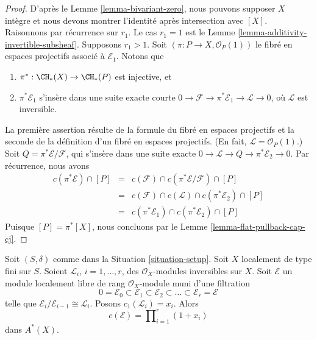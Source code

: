 \begin{proof}
D'après le Lemme \ref{lemma-bivariant-zero}, nous pouvons supposer $X$ intègre
et nous devons montrer l'identité après intersection avec $[X]$.
Raisonnons par récurrence sur $r_1$. Le cas $r_1 = 1$ est le
Lemme \ref{lemma-additivity-invertible-subsheaf}.
Supposons $r_1 > 1$. Soit $(\pi : P \to X, \mathcal{O}_P(1))$
le fibré en espaces projectifs associé à $\mathcal{E}_1$. Notons que
\begin{enumerate}
\item $\pi^* : \CH_*(X) \to \CH_*(P)$ est injective, et
\item $\pi^*\mathcal{E}_1$ s'insère dans une suite exacte courte
$0 \to \mathcal{F} \to \pi^*\mathcal{E}_1 \to \mathcal{L} \to 0$,
où $\mathcal{L}$ est inversible.
\end{enumerate}
La première assertion résulte de la formule du fibré en espaces projectifs
et la seconde de la définition d'un fibré en espaces projectifs.
(En fait, $\mathcal{L} = \mathcal{O}_P(1)$.)
Soit $Q = \pi^*\mathcal{E}/\mathcal{F}$, qui s'insère dans une
suite exacte $0 \to \mathcal{L} \to Q \to \pi^*\mathcal{E}_2 \to 0$.
Par récurrence, nous avons
\begin{eqnarray*}
c(\pi^*\mathcal{E}) \cap [P]
& = &
c(\mathcal{F}) \cap c(\pi^*\mathcal{E}/\mathcal{F}) \cap [P] \\
& = &
c(\mathcal{F}) \cap c(\mathcal{L}) \cap c(\pi^*\mathcal{E}_2) \cap [P] \\
& = &
c(\pi^*\mathcal{E}_1) \cap c(\pi^*\mathcal{E}_2) \cap [P]
\end{eqnarray*}
Puisque $[P] = \pi^*[X]$, nous
concluons par le Lemme \ref{lemma-flat-pullback-cap-cj}.
\end{proof}

\begin{lemma}
\label{lemma-chern-filter-by-linebundles}
Soit $(S, \delta)$ comme dans la Situation \ref{situation-setup}.
Soit $X$ localement de type fini sur $S$.
Soient ${\mathcal L}_i$, $i = 1, \ldots, r$, des
$\mathcal{O}_X$-modules inversibles sur $X$.
Soit $\mathcal{E}$ un module localement libre de rang
$\mathcal{O}_X$-module muni d'une filtration
$$
0 = \mathcal{E}_0 \subset \mathcal{E}_1 \subset \mathcal{E}_2
\subset \ldots \subset \mathcal{E}_r = \mathcal{E}
$$
telle que $\mathcal{E}_i/\mathcal{E}_{i - 1} \cong \mathcal{L}_i$.
Posons $c_1({\mathcal L}_i) = x_i$. Alors
$$
c(\mathcal{E})
=
\prod\nolimits_{i = 1}^r (1 + x_i)
$$
dans $A^*(X)$.
\end{lemma}


